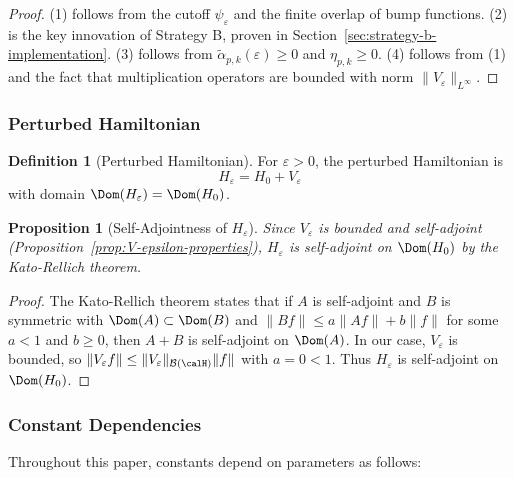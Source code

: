 ﻿\documentclass[12pt,a4paper]{article}
\newtheorem{proposition}[theorem]{Proposition}
\theoremstyle{definition}
\newtheorem{definition}[theorem]{Definition}
\theoremstyle{remark}
\begin{document}
\begin{proof}
(1) follows from the cutoff $\psi_\varepsilon$ and the finite overlap of bump functions. (2) is the key innovation of Strategy B, proven in Section~\ref{sec:strategy-b-implementation}. (3) follows from $\widetilde{\alpha}_{p,k}(\varepsilon) \geq 0$ and $\eta_{p,k} \geq 0$. (4) follows from (1) and the fact that multiplication operators are bounded with norm $\|V_\varepsilon\|_{L^\infty}$.
\end{proof}

\subsubsection{Perturbed Hamiltonian}

\begin{definition}[Perturbed Hamiltonian]
\label{def:perturbed-hamiltonian}
For $\varepsilon > 0$, the perturbed Hamiltonian is
\[
H_\varepsilon = H_0 + V_\varepsilon
\]
with domain $\Dom(H_\varepsilon) = \Dom(H_0)$.
\end{definition}

\begin{proposition}[Self-Adjointness of $H_\varepsilon$]
\label{prop:H-epsilon-self-adjoint}
Since $V_\varepsilon$ is bounded and self-adjoint (Proposition~\ref{prop:V-epsilon-properties}), $H_\varepsilon$ is self-adjoint on $\Dom(H_0)$ by the Kato-Rellich theorem.
\end{proposition}

\begin{proof}
The Kato-Rellich theorem states that if $A$ is self-adjoint and $B$ is symmetric with $\Dom(A) \subset \Dom(B)$ and $\|Bf\| \leq a\|Af\| + b\|f\|$ for some $a < 1$ and $b \geq 0$, then $A + B$ is self-adjoint on $\Dom(A)$. In our case, $V_\varepsilon$ is bounded, so $\|V_\varepsilon f\| \leq \|V_\varepsilon\|_{\mathcal{B}(\calH)} \|f\|$ with $a = 0 < 1$. Thus $H_\varepsilon$ is self-adjoint on $\Dom(H_0)$.
\end{proof}

\subsubsection{Constant Dependencies}

Throughout this paper, constants depend on parameters as follows:
\end{document}
